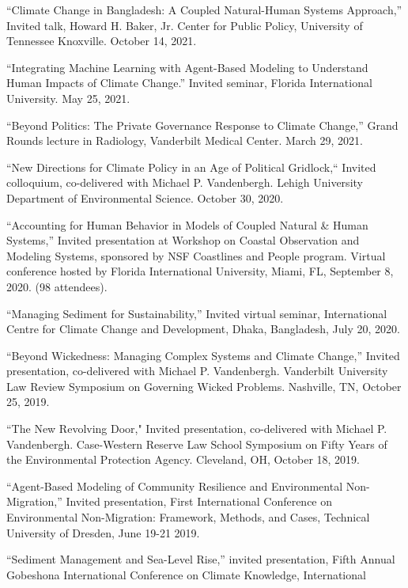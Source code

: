 \item ``Climate Change in Bangladesh: A Coupled Natural-Human Systems
   Approach,'' Invited talk, Howard H. Baker, Jr. Center for Public Policy,
   University of Tennessee Knoxville. October 14, 2021.
\item ``Integrating Machine Learning with Agent-Based Modeling to Understand
  Human Impacts of Climate Change.'' Invited seminar, Florida International
  University. May 25, 2021.
\item ``Beyond Politics: The Private Governance Response to Climate
  Change,'' Grand Rounds lecture in Radiology, Vanderbilt Medical Center.
  March 29, 2021.
\item ``New Directions for Climate Policy in an Age of Political Gridlock,``
  Invited colloquium, co-delivered with Michael P. Vandenbergh. Lehigh
  University Department of Environmental Science. October 30, 2020.
\item ``Accounting for Human Behavior in Models of Coupled Natural \& Human
  Systems,'' Invited presentation at Workshop on Coastal Observation and
  Modeling Systems, sponsored by NSF Coastlines and People program. Virtual
  conference hosted by Florida International University, Miami, FL,
  September 8, 2020. (98 attendees).
\item ``Managing Sediment for Sustainability,'' Invited virtual seminar,
  International Centre for Climate Change and Development, Dhaka, Bangladesh,
  July 20, 2020.
\item ``Beyond Wickedness: Managing Complex Systems and Climate Change,''
  Invited presentation, co-delivered with Michael P. Vandenbergh. Vanderbilt
  University Law Review Symposium on Governing Wicked Problems. Nashville, TN,
  October 25, 2019.
\item ``The New Revolving Door," Invited presentation, co-delivered with
  Michael P. Vandenbergh. Case-Western Reserve Law School Symposium on Fifty
  Years of the Environmental Protection Agency. Cleveland, OH, October 18, 2019.
\item ``Agent-Based Modeling of Community Resilience and Environmental
 Non-Migration,'' Invited presentation, First International Conference on
 Environmental Non-Migration: Framework, Methods, and Cases, Technical
 University of Dresden, June 19-21 2019.
\item ``Sediment Management and Sea-Level Rise,'' invited presentation, Fifth
  Annual Gobeshona International Conference on Climate Knowledge, International
